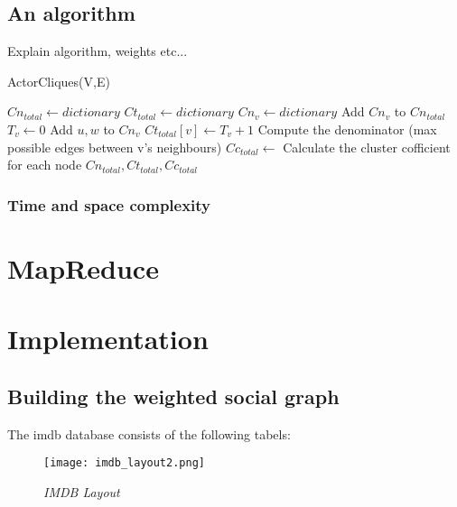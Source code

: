\documentclass{article}
\begin{document}
\subsection{An algorithm}
Explain algorithm, weights etc...

\begin{algorithm}
\caption{ActorCliques(V,E)}
\begin{algorithmic}
\STATE $Cn_{total} \leftarrow dictionary$
\STATE $Ct_{total} \leftarrow dictionary$
\STATE $Cn_{v} \leftarrow dictionary$
\STATE Add $Cn_v$ to $Cn_{total}$
\STATE $T_{v} \leftarrow 0$
\STATE Add $u, w$ to $Cn_{v}$
\STATE $Ct_{total}[v] \leftarrow T_v + 1$
\ENDIF
\ENDFOR
\ENDFOR
\STATE Compute the denominator (max possible edges between v's neighbours)
\ENDFOR
\STATE $Cc_{total} \leftarrow$ Calculate the cluster cofficient for each node
\RETURN $Cn_{total},Ct_{total},Cc_{total}$
\end{algorithmic}
\end{algorithm}

\subsubsection{Time and space complexity}

\section{MapReduce}


\section{Implementation}

\subsection{Building the weighted social graph}

The imdb database consists of the following tabels:
\begin{figure}[h]
\begin{center}
\texttt{[image: imdb\_layout2.png]}
\end{center}
\caption{\small {\it {IMDB Layout}}} 
\label{fig:IMDB Layout}
\end{figure}
\end{document}
